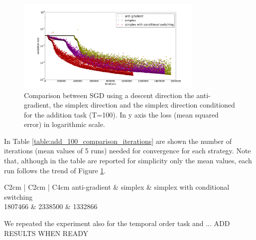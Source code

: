 \begin{figure}
	\centering
	\includegraphics[width= 0.8\textwidth]{chapter4/compare_add_simplex.png}
	\caption{Comparison between SGD using a descent direction the anti-gradient, the simplex direction and the simplex direction conditioned for the addition task (T=100). In y axis the loss (mean squared error) in logarithmic scale.}
	\label{fig:comparisong_add_simplex}
\end{figure}

In Table \ref{table:add_100_comparison_iterations} are shown the number of iterations (mean values of 5 runs) needed for convergence for each strategy. Note that, although in the table are reported for simplicity only the mean values, each run follows the trend of Figure \ref{fig:comparisong_add_simplex}.
\begin{table}
	\centering
	\begin{tabular}{C{2cm} | C{2cm} | C{4cm}}
		anti-gradient & simplex & simplex with conditional switching \\
		1807466 & 2338500 & 1332866 \\
	\end{tabular}
	\caption{Number of iterations until convergence for the addition task (T=100). Mean of 5 runs. TODO UPDATE RESULTS WITH NEW RUNS}
	\label{table:add_100_comparison_iterations}
\end{table}

We repeated the experiment also for the temporal order task and ... ADD RESULTS WHEN READY